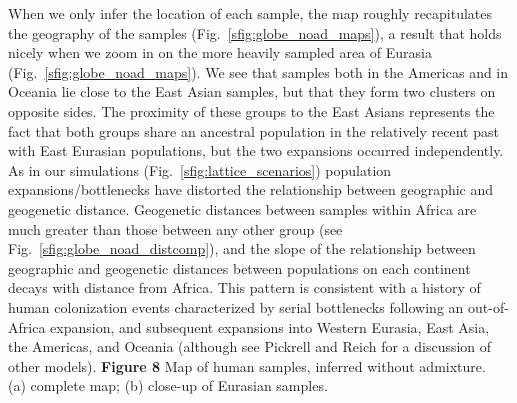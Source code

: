 \documentclass[10pt,letterpaper]{article}
\begin{document}
When we only infer the location of each sample, the map roughly recapitulates the geography of the samples (Fig.\ \ref{sfig:globe_noad_maps}), a result that holds nicely when we zoom in on the more heavily sampled area of Eurasia (Fig.\ \ref{sfig:globe_noad_maps}). We see that samples both in the Americas and in Oceania lie close to the East Asian samples, but that they form two clusters on opposite sides.  The proximity of these groups to the East Asians represents the fact that both groups share an ancestral population in the relatively recent past with East Eurasian populations, but the two expansions occurred independently. As in our simulations (Fig.\ \ref{sfig:lattice_scenarios}) population expansions/bottlenecks have distorted the relationship between geographic and geogenetic distance. 
Geogenetic distances between samples within Africa are much greater than those between any other group (see Fig.\ \ref{sfig:globe_noad_distcomp}), 
and the slope of the relationship between geographic and geogenetic distances between populations on each continent decays with distance from Africa.  
This pattern is consistent with a history of human colonization events characterized by serial bottlenecks \cite{Harpending_Rogers_2000,prugnolle_geography_2005,Ramachandran:05} following an out-of-Africa expansion, and subsequent expansions into Western Eurasia, East Asia, the Americas, and Oceania (although see Pickrell and Reich \cite{pickrell_reich:14} for a discussion of other models). 
%
\newline\newline
%
{\bf{Figure 8}} Map of human samples, inferred without admixture.\\ (a) complete map; (b) close-up of Eurasian samples.
%
\newline\newline
\end{document}
